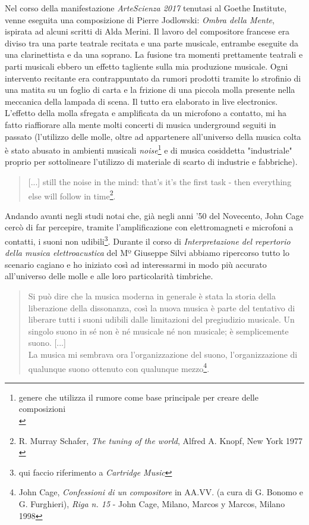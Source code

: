 Nel corso della manifestazione \textit{ArteScienza 2017} tenutasi al Goethe Institute, venne eseguita una composizione di Pierre Jodlowski: \textit{Ombra della Mente}, ispirata ad alcuni scritti di Alda Merini. Il lavoro del compositore francese era diviso tra una parte teatrale recitata e una parte musicale, entrambe eseguite da una clarinettista e da una soprano. La fusione tra momenti prettamente teatrali e parti musicali ebbero un effetto tagliente sulla mia produzione musicale. Ogni intervento recitante era contrappuntato da rumori prodotti tramite lo strofinio di una matita su un foglio di carta e la frizione di una piccola molla presente nella meccanica della lampada di scena. Il tutto era elaborato in live electronics. L'effetto della molla sfregata e amplificata da un microfono a contatto, mi ha fatto riaffiorare alla mente molti concerti di musica underground seguiti in passato (l'utilizzo delle molle, oltre ad appartenere all'universo della musica colta è stato abusato in ambienti musicali \textit{noise}\footnote{genere che utilizza il rumore come base principale per creare delle composizioni \\} e di musica cosiddetta "industriale" proprio per sottolineare l'utilizzo di materiale di scarto di industrie e fabbriche).
\begin{quotation}
[...] still the noise in the mind: that's it's the first task - then everything else will follow in time\footnote{R. Murray Schafer, \textit{The tuning of the world}, Alfred A. Knopf, New York 1977 \\}.
\end{quotation}
Andando avanti negli studi notai che, già negli anni '50 del Novecento, John Cage cercò di far percepire, tramite l'amplificazione con elettromagneti e microfoni a contatti, i suoni non udibili\footnote{qui faccio riferimento a \textit{Cartridge Music}}. Durante il corso di \textit{Interpretazione del repertorio della musica elettroacustica} del Mº Giuseppe Silvi abbiamo ripercorso tutto lo scenario cagiano e ho iniziato così ad interessarmi in modo più accurato all'universo delle molle e alle loro particolarità timbriche.
\begin{small}
\begin{quotation}
Si può dire che la musica moderna in generale è stata la storia della liberazione della dissonanza, così la nuova musica è parte del tentativo di liberare tutti i suoni udibili dalle limitazioni del pregiudizio musicale.
Un singolo suono in sé non è né musicale né non musicale; è semplicemente suono. [...] \\
La musica mi sembrava ora l'organizzazione del suono, l'organizzazione di qualunque suono ottenuto con qualunque mezzo\footnote{John Cage, \textit{Confessioni di un compositore} in AA.VV. (a cura di G. Bonomo e G. Furghieri), \textit{Riga n. 15} - John Cage, Milano, Marcos y Marcos, Milano 1998}.
\end{quotation}
\end{small}
